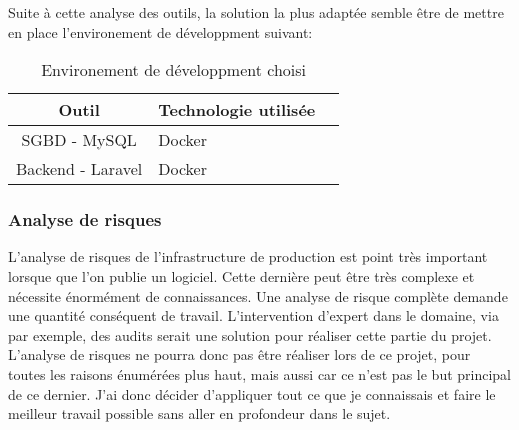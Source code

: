 \documentclass[
    iai, %
    il, %
]{heig-tb}
\begin{document}



Suite à cette analyse des outils, la solution la plus adaptée semble être de mettre en place l'environement de développment suivant:

\begin{table}[h]
    \begin{center}
        \caption{Environement de développment choisi \label{env_prod}}
        \begin{tabular}{c|l|r}
            Outil             & Technologie utilisée \\ \hline
            SGBD - MySQL      & Docker               \\
            Backend - Laravel & Docker               \\
        \end{tabular}
    \end{center}
\end{table}

\subsubsection{Analyse de risques}

L'analyse de risques de l'infrastructure de production est point très important lorsque que l'on publie un logiciel. Cette dernière peut être très complexe et nécessite énormément de connaissances.
Une analyse de risque complète demande une quantité conséquent de travail. L'intervention d'expert dans le domaine, via par exemple, des audits serait une solution pour réaliser cette partie du projet.\newline
L'analyse de risques ne pourra donc pas être réaliser lors de ce projet, pour toutes les raisons énumérées plus haut, mais aussi car ce n'est pas le but principal de ce dernier.\newline
J'ai donc décider d'appliquer tout ce que je connaissais et faire le meilleur travail possible sans aller en profondeur dans le sujet.

\end{document}
